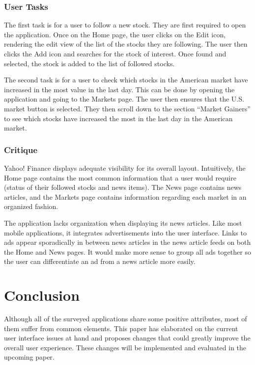 \documentclass{sigchi}
\begin{document}
\subsubsection{User Tasks}
The first task is for a user to follow a new stock. They are first required to open the application. Once on the Home page, the user clicks on the Edit icon, rendering the edit view of the list of the stocks they are following. The user then clicks the Add icon and searches for the stock of interest. Once found and selected, the stock is added to the list of followed stocks.\par

The second task is for a user to check which stocks in the American market have increased in the most value in the last day. This can be done by opening the application and going to the Markets page. The user then ensures that the U.S. market button is selected. They then scroll down to the section ``Market Gainers'' to see which stocks have increased the most in the last day in the American market.

\subsubsection{Critique}
Yahoo! Finance displays adequate visibility for its overall layout. Intuitively, the Home page contains the most common information that a user would require (status of their followed stocks and news items). The News page contains news articles, and the Markets page contains information regarding each market in an organized fashion. \par

The application lacks organization when displaying its news articles. Like most mobile applications, it integrates advertisements into the user interface. Links to ads appear sporadically in between news articles in the news article feeds on both the Home and News pages. It would make more sense to group all ads together so the user can differentiate an ad from a news article more easily. 

\section{Conclusion}
Although all of the surveyed applications share some positive attributes, most of them suffer from common elements. This paper has elaborated on the current user interface issues at hand and proposes changes that could greatly improve the overall user experience. These changes will be implemented and evaluated in the upcoming paper. 
\end{document}
